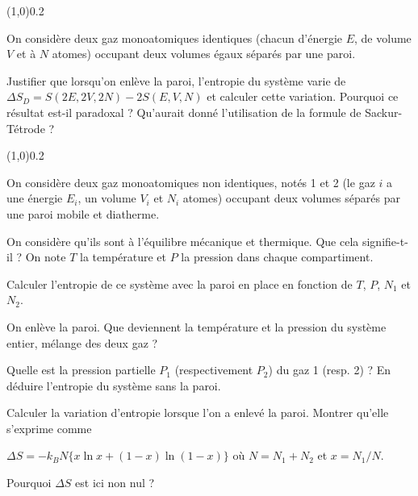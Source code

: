 \begin{center} \vspace{-0.5cm}\line(1,0){0.2\textwidth} \vspace{-0.5cm}\end{center}


On considère deux gaz monoatomiques identiques (chacun d'énergie $E$, de volume $V$ et à $N$ atomes) occupant deux volumes égaux séparés par une paroi. 

\question Justifier que lorsqu’on enlève la paroi, l’entropie du système varie de $\Delta S_D = S(2E, 2V, 2N)-2S(E, V, N)$ et calculer cette variation. Pourquoi ce résultat est-il paradoxal ? Qu'aurait donné l'utilisation de la formule de Sackur-Tétrode ?

\begin{center} \vspace{-0.5cm}\line(1,0){0.2\textwidth} \vspace{-0.5cm}\end{center}


On considère deux gaz monoatomiques non identiques, notés 1 et 2 (le gaz $i$ a une énergie $E_i$, un volume $V_i$ et $N_i$ atomes) occupant deux volumes séparés par une paroi mobile et diatherme.

\medskip

\question On considère qu'ils sont à l'équilibre mécanique et thermique. Que cela signifie-t-il ? On note $T$ la température et $P$ la pression dans chaque compartiment.

\question Calculer l'entropie de ce système avec la paroi en place en fonction de  $T$, $P$, $N_1$ et $N_2$.

\question On enlève la paroi. Que deviennent la température et la pression du système entier, mélange des deux gaz ?

\question Quelle est la pression partielle $P_1$ (respectivement $P_2$) du gaz 1 (resp. 2) ? En déduire l'entropie du système sans la paroi.

\question Calculer la variation d'entropie lorsque l'on a enlevé la paroi. Montrer qu'elle s'exprime comme

\mbox{$\Delta S = - k_B N \{ x \ln{x}+(1-x) \ln{(1-x)} \}$} où $N=N_1+N_2$ et $x=N_1/N$.

\question Pourquoi $\Delta S$ est ici non nul ?
